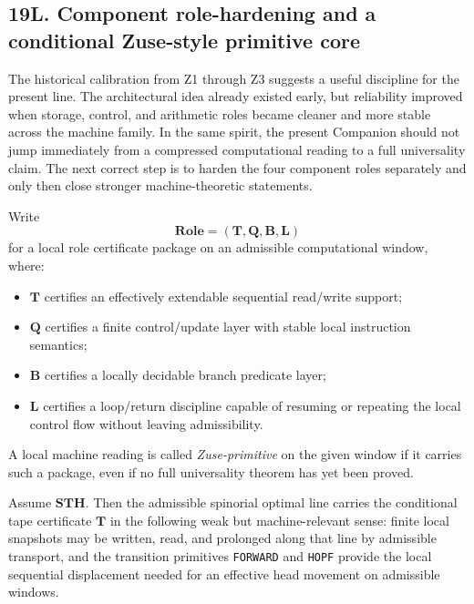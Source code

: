 \subsection*{19L. Component role-hardening and a conditional Zuse-style primitive core}
The historical calibration from Z1 through Z3 suggests a useful discipline for the present line. The architectural idea already existed early, but reliability improved when storage, control, and arithmetic roles became cleaner and more stable across the machine family. In the same spirit, the present Companion should not jump immediately from a compressed computational reading to a full universality claim. The next correct step is to harden the four component roles separately and only then close stronger machine-theoretic statements.

\begin{definition}
Write
\[
\mathbf{Role}=(\mathbf T,\mathbf Q,\mathbf B,\mathbf L)
\]
for a local role certificate package on an admissible computational window, where:
\begin{itemize}[leftmargin=2em]
 \item $\mathbf T$ certifies an effectively extendable sequential read/write support;
 \item $\mathbf Q$ certifies a finite control/update layer with stable local instruction semantics;
 \item $\mathbf B$ certifies a locally decidable branch predicate layer;
 \item $\mathbf L$ certifies a loop/return discipline capable of resuming or repeating the local control flow without leaving admissibility.
\end{itemize}
A local machine reading is called \emph{Zuse-primitive} on the given window if it carries such a package, even if no full universality theorem has yet been proved.
\end{definition}

\begin{proposition}
Assume $\mathbf{STH}$. Then the admissible spinorial optimal line carries the conditional tape certificate $\mathbf T$ in the following weak but machine-relevant sense: finite local snapshots may be written, read, and prolonged along that line by admissible transport, and the transition primitives \texttt{FORWARD} and \texttt{HOPF} provide the local sequential displacement needed for an effective head movement on admissible windows.
\end{proposition}

